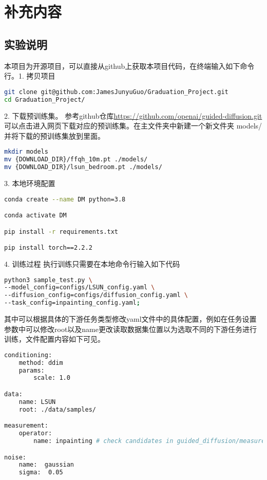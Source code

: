 
\chapter{补充内容}
\label{appendix}
\section{实验说明}
本项目为开源项目，可以直接从github上获取本项目代码，在终端输入如下命令行。1. 拷贝项目
\label{experiment instructions}
\begin{lstlisting}[language=bash]
git clone git@github.com:JamesJunyuGuo/Graduation_Project.git
cd Graduation_Project/
\end{lstlisting}
2. 下载预训练集。 参考github仓库\href{https://github.com/openai/guided-diffusion.git}{https://github.com/openai/guided-diffusion.git}可以点击进入网页下载对应的预训练集。在主文件夹中新建一个新文件夹 models/ 并将下载的预训练集放到里面。
\begin{lstlisting}[language=bash]
mkdir models
mv {DOWNLOAD_DIR}/ffqh_10m.pt ./models/
mv {DOWNLOAD_DIR}/lsun_bedroom.pt ./models/
\end{lstlisting}
3. 本地环境配置
\begin{lstlisting}[language=bash]
conda create --name DM python=3.8

conda activate DM

pip install -r requirements.txt

pip install torch==2.2.2
\end{lstlisting}
4. 训练过程   
执行训练只需要在本地命令行输入如下代码
\begin{lstlisting}[language=bash]
python3 sample_test.py \
--model_config=configs/LSUN_config.yaml \
--diffusion_config=configs/diffusion_config.yaml \
--task_config=inpainting_config.yaml;
\end{lstlisting}
其中可以根据具体的下游任务类型修改yaml文件中的具体配置，例如在任务设置参数中可以修改root以及name更改读取数据集位置以为选取不同的下游任务进行训练，文件配置内容如下可见。
\begin{lstlisting}[language=bash]
conditioning:
    method: ddim 
    params:
        scale: 1.0

data:
    name: LSUN
    root: ./data/samples/

measurement:
    operator: 
        name: inpainting # check candidates in guided_diffusion/measurements.py

noise:
    name:  gaussian 
    sigma:  0.05 
\end{lstlisting}






